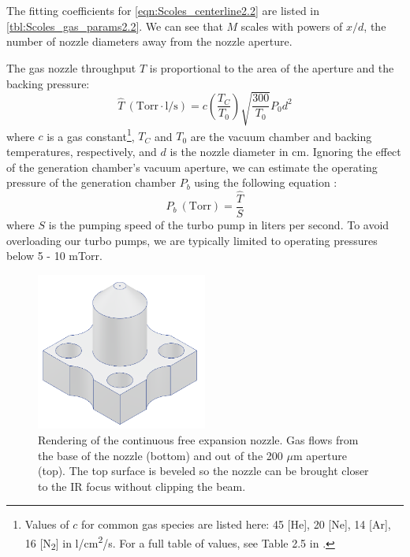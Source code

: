 The fitting coefficients for \cref{eqn:Scoles_centerline2.2} are listed in \cref{tbl:Scoles_gas_params2.2}. We can see that $M$ scales with powers of $x/d$, the number of nozzle diameters away from the nozzle aperture.

The gas nozzle throughput $\hat{T}$ is proportional to the area of the aperture and the backing pressure:
\begin{equation}
\hat{T} \ (\text{Torr} \cdot \text{l}/\text{s}) = c \left(\frac{T_C}{T_0} \right)\sqrt{\frac{300}{T_0}} P_0 d^2
\label{eqn:nozzle_thruput}
\end{equation}
where $c$ is a gas constant\footnote{Values of $c$ for common gas species are listed here: 45 [He], 20 [Ne], 14 [Ar], 16 [N\textsubscript{2}] in l/cm\textsuperscript{2}/s. For a full table of values, see Table 2.5 in \cite{millerFreeJetSources1988}.}, $T_C$ and $T_0$ are the vacuum chamber and backing temperatures, respectively, and $d$ is the nozzle diameter in cm. Ignoring the effect of the generation chamber's vacuum aperture, we can estimate the operating pressure of the generation chamber $P_b$ using the following equation \cite{hablanianHighvacuumTechnologyPractical1997}:
\begin{equation}
P_b \ (\text{Torr}) = \frac{\hat{T}}{S}
\end{equation}
where $S$ is the pumping speed of the turbo pump in liters per second. To avoid overloading our turbo pumps, we are typically limited to operating pressures below 5 - 10 mTorr.

\begin{figure}
	\centering
	\includegraphics[width=0.5\textwidth]{figures/chap3/gas_nozzle.png}
	\caption{Rendering of the continuous free expansion nozzle. Gas flows from the base of the nozzle (bottom) and out of the 200 $\mu$m aperture (top). The top surface is beveled so the nozzle can be brought closer to the IR focus without clipping the beam.}
	\label{fig:gas_nozzle}
\end{figure}

